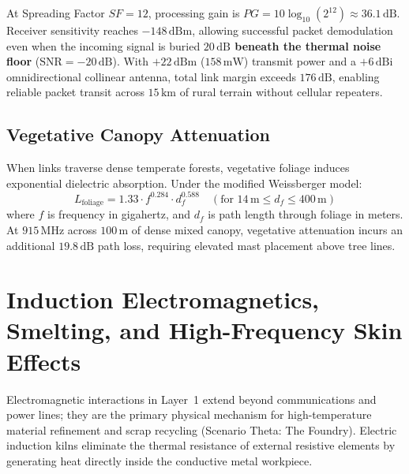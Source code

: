 At Spreading Factor $SF = 12$, processing gain is $PG = 10\log_{10}(2^{12}) \approx 36.1\,\mathrm{dB}$. Receiver sensitivity reaches $-148\,\mathrm{dBm}$, allowing successful packet demodulation even when the incoming signal is buried \textbf{$20\,\mathrm{dB}$ beneath the thermal noise floor} ($\mathrm{SNR} = -20\,\mathrm{dB}$). With $+22\,\mathrm{dBm}$ ($158\,\mathrm{mW}$) transmit power and a $+6\,\mathrm{dBi}$ omnidirectional collinear antenna, total link margin exceeds $176\,\mathrm{dB}$, enabling reliable packet transit across $15\,\mathrm{km}$ of rural terrain without cellular repeaters.

\subsection{Vegetative Canopy Attenuation}
When links traverse dense temperate forests, vegetative foliage induces exponential dielectric absorption. Under the modified Weissberger model:
\begin{equation}
L_{\mathrm{foliage}} = 1.33 \cdot f^{0.284} \cdot d_f^{0.588} \quad (\text{for } 14\,\mathrm{m} \le d_f \le 400\,\mathrm{m})
\label{eq:weissberger_foliage}
\end{equation}
where $f$ is frequency in gigahertz, and $d_f$ is path length through foliage in meters. At $915\,\mathrm{MHz}$ across $100\,\mathrm{m}$ of dense mixed canopy, vegetative attenuation incurs an additional $19.8\,\mathrm{dB}$ path loss, requiring elevated mast placement above tree lines.

\section{Induction Electromagnetics, Smelting, and High-Frequency Skin Effects}
\label{sec:em_induction}

Electromagnetic interactions in Layer~1 extend beyond communications and power lines; they are the primary physical mechanism for high-temperature material refinement and scrap recycling (Scenario Theta: The Foundry). Electric induction kilns eliminate the thermal resistance of external resistive elements by generating heat directly inside the conductive metal workpiece.

